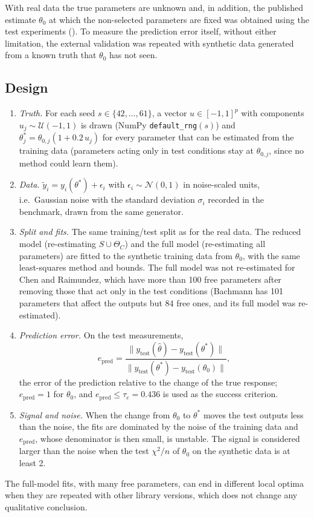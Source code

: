 
With real data the true parameters are unknown and, in addition, the published estimate $\theta_0$ at which the non-selected parameters are fixed was obtained using the test experiments (). To measure the prediction error itself, without either limitation, the external validation was repeated with synthetic data generated from a known truth that $\theta_0$ has not seen.

\subsection*{Design}
\begin{enumerate}\itemsep0pt
\item \emph{Truth.} For each seed $s\in\{42,\dots,61\}$, a vector $u\in[-1,1]^p$ with components $u_j\sim\mathcal U(-1,1)$ is drawn (NumPy \texttt{default\_rng}$(s)$) and $\theta^\ast_j=\theta_{0,j}(1+0.2\,u_j)$ for every parameter that can be estimated from the training data (parameters acting only in test conditions stay at $\theta_{0,j}$, since no method could learn them).
\item \emph{Data.} $\tilde y_i=y_i(\theta^\ast)+\epsilon_i$ with $\epsilon_i\sim\mathcal N(0,1)$ in noise-scaled units, i.e.\ Gaussian noise with the standard deviation $\sigma_i$ recorded in the benchmark, drawn from the same generator.
\item \emph{Split and fits.} The same training/test split as for the real data. The reduced model (re-estimating $S\cup\Theta_C$) and the full model (re-estimating all parameters) are fitted to the synthetic training data from $\theta_0$, with the same least-squares method and bounds. The full model was not re-estimated for Chen and Raimundez, which have more than 100 free parameters after removing those that act only in the test conditions (Bachmann has 101 parameters that affect the outputs but 84 free ones, and its full model was re-estimated).
\item \emph{Prediction error.} On the test measurements,
\[ e_{\mathrm{pred}}=\frac{\|y_{\mathrm{test}}(\hat\theta)-y_{\mathrm{test}}(\theta^\ast)\|}{\|y_{\mathrm{test}}(\theta^\ast)-y_{\mathrm{test}}(\theta_0)\|}, \]
the error of the prediction relative to the change of the true response; $e_{\mathrm{pred}}=1$ for $\theta_0$, and $e_{\mathrm{pred}}\le\tau_e=0.436$ is used as the success criterion.
\item \emph{Signal and noise.} When the change from $\theta_0$ to $\theta^\ast$ moves the test outputs less than the noise, the fits are dominated by the noise of the training data and $e_{\mathrm{pred}}$, whose denominator is then small, is unstable. The signal is considered larger than the noise when the test $\chi^2/n$ of $\theta_0$ on the synthetic data is at least 2.
\end{enumerate}
The full-model fits, with many free parameters, can end in different local optima when they are repeated with other library versions, which does not change any qualitative conclusion.

